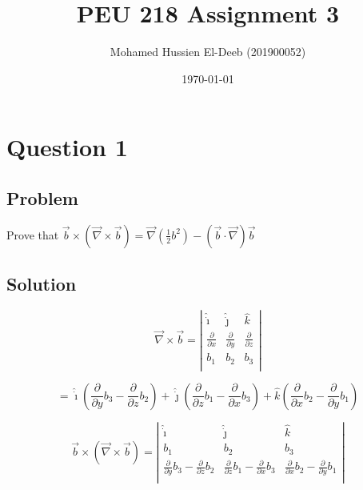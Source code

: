 \documentclass[12pt]{article}
\title{PEU 218 Assignment 3}
\author{Mohamed Hussien El-Deeb (201900052)}
\date{\today}
\begin{document}
\maketitle
\tableofcontents
\hypersetup{linkcolor=RoyalBlue4}

\newpage
\section{Question 1}

\subsection{Problem}

Prove that \(\vec{b} \times(\vec{\nabla} \times \vec{b})=\vec{\nabla}\left(\frac{1}{2} b^2\right)-(\vec{b} \cdot \vec{\nabla}) \vec{b}\)

\subsection{Solution}

\[
    \vec{\nabla} \times \vec{b}
    =\left|
    \begin{array}{ccc}
        \hat{\dot{\imath}}          & \hat{\dot{\jmath}}          & \hat{k}                     \\
        \frac{\partial}{\partial x} & \frac{\partial}{\partial y} & \frac{\partial}{\partial z} \\
        b_{1}                       & b_{2}                       & b_{3}                       \\
    \end{array}
    \right|
\]

\[
    = \hat{\dot{\imath}} \left(\frac{\partial}{\partial y} b_{3} - \frac{\partial}{\partial z} b_{2}\right)
    + \hat{\dot{\jmath}} \left(\frac{\partial}{\partial z} b_{1} - \frac{\partial}{\partial x} b_{3}\right)
    + \hat{k} \left(\frac{\partial}{\partial x} b_{2} - \frac{\partial}{\partial y} b_{1}\right)
\]

\[
    \vec{b} \times \left(\vec{\nabla} \times \vec{b} \right)
    = \left|
    \begin{array}{ccc}
        \hat{\dot{\imath}}                                                    & \hat{\dot{\jmath}}                                                    & \hat{k}                                                               \\
        b_{1}                                                                 & b_{2}                                                                 & b_{3}                                                                 \\
        \frac{\partial}{\partial y} b_{3} - \frac{\partial}{\partial z} b_{2} & \frac{\partial}{\partial z} b_{1} - \frac{\partial}{\partial x} b_{3} & \frac{\partial}{\partial x} b_{2} - \frac{\partial}{\partial y} b_{1} \\
    \end{array}
    \right|
\]
\end{document}
